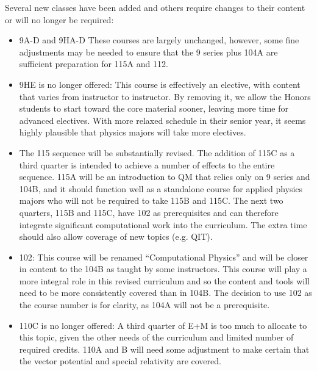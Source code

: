 \documentclass[12pt]{article}
\begin{document}
Several new classes have been added and others require changes to their content or will no longer be required:
\begin{itemize}
\item 9A-D and 9HA-D  These courses are largely unchanged, however, some fine adjustments may be needed to ensure that the 9 series plus 104A are sufficient preparation for 115A and 112.
\item 9HE is no longer offered:  This course is effectively an elective, with content that varies from instructor to instructor.  By removing it, we allow the Honors students to start toward the core material sooner, leaving more time for advanced electives. With more relaxed schedule in their senior year, it seems highly plausible that physics majors will take more electives.
\item The 115 sequence will be substantially revised.  The addition of 115C as a third quarter is intended to achieve a number of effects to the entire sequence.  115A will be an introduction to QM that relies only on 9 series and 104B, and it should function well as a standalone course for applied physics majors who will not be required to take 115B and 115C.  The next two quarters, 115B and 115C, have 102 as prerequisites and can therefore integrate significant computational work into the curriculum.  The extra time should also allow coverage of new topics (e.g. QIT).
\item 102:  This course will be renamed ``Computational Physics'' and will be closer in content to the 104B as taught by some instructors.  This course will play a more integral role in this revised curriculum and so the content and tools will need to be more consistently covered than in 104B.  The decision to use 102 as the course number is for clarity, as 104A will not be a prerequisite.
\item 110C is no longer offered:  A third quarter of E+M is too much to allocate to this topic, given the other needs of the curriculum and limited number of required credits. 110A and B will need some adjustment to make certain that the vector potential and special relativity are covered.
\end{itemize}
\end{document}
